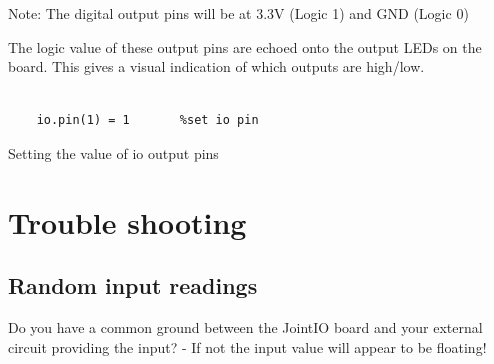 \documentclass[a4paper, 12pt]{article}
\begin{document}
Note: The digital output pins will be at 3.3V (Logic 1) and GND (Logic 0)


The logic value of these output pins are echoed onto the output LEDs on the board. This gives a visual indication of which outputs are high/low.

\begin{python}
\begin{verbatim}

	io.pin(1) = 1		%set io pin 

\end{verbatim}
  \caption{Setting the value of io output pins} 
\end{python}

\section{Trouble shooting}
\subsection{Random input readings}
Do you have a common ground between the JointIO board and your external circuit providing the input? - If not the input value will appear to be floating!
\end{document}

